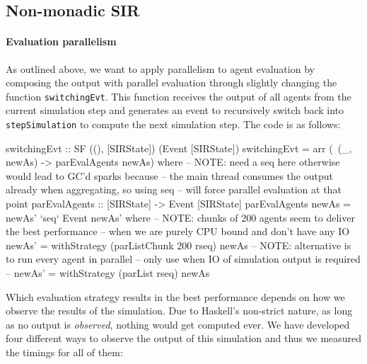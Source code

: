 \subsection{Non-monadic SIR}
\label{parallel_nonmonadic_sir}

\paragraph{Evaluation parallelism}
As outlined above, we want to apply parallelism to agent evaluation by composing the output with parallel evaluation through slightly changing the function \texttt{switchingEvt}. This function receives the output of all agents from the current simulation step and generates an event to recursively switch back into \texttt{stepSimulation} to compute the next simulation step. The code is as follows:

\begin{HaskellCode}
switchingEvt :: SF ((), [SIRState]) (Event [SIRState])
switchingEvt = arr (\ (_, newAs) -> parEvalAgents newAs)
  where
    -- NOTE: need a seq here otherwise would lead to GC'd sparks because
    -- the main thread consumes the output already when aggregating, so using seq 
    -- will force parallel evaluation at that point 
    parEvalAgents :: [SIRState] -> Event [SIRState]
    parEvalAgents newAs = newAs' `seq` Event newAs' 
      where
        -- NOTE: chunks of 200 agents seem to deliver the best performance
        -- when we are purely CPU bound and don't have any IO
        newAs' = withStrategy (parListChunk 200 rseq) newAs
        -- NOTE: alternative is to run every agent in parallel
        -- only use when IO of simulation output is required
        -- newAs' = withStrategy (parList rseq) newAs
\end{HaskellCode}

Which evaluation strategy results in the best performance depends on how we observe the results of the simulation. Due to Haskell's non-strict nature, as long as no output is \textit{observed}, nothing would get computed ever. We have developed four different ways to observe the output of this simulation and thus we measured the timings for all of them:

